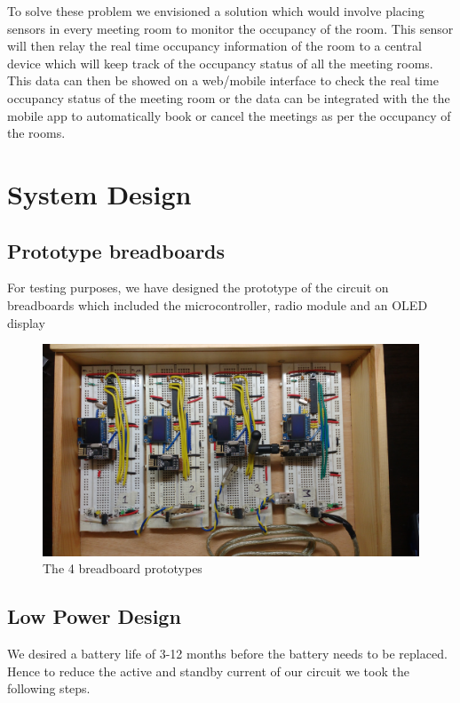 \documentclass[journal]{IEEEtran}
\begin{document}
To solve these problem we envisioned a solution which would involve placing sensors in every meeting room to monitor the occupancy of the room. This sensor will then relay the real time occupancy information of the room to a central device which will keep track of the occupancy status of all the meeting rooms. This data can then be showed on a web/mobile interface to check the real time occupancy status of the meeting room or the data can be integrated with the the mobile app to automatically book or cancel the meetings as per the occupancy of the rooms.


\section{System Design}
\subsection{Prototype breadboards}
For testing purposes, we have designed the prototype of the circuit on breadboards which included the microcontroller, radio module and an OLED display

\begin{figure}[ht]
	\centering
	\includegraphics[scale=0.06]{all_breadboards.jpg}
	\caption{The 4 breadboard prototypes}
	\label{fig_breadboard}
\end{figure}

\subsection{Low Power Design}
We desired a battery life of 3-12 months before the battery needs to be replaced. Hence to reduce the active and standby current of our circuit we took the following steps.
\end{document}
